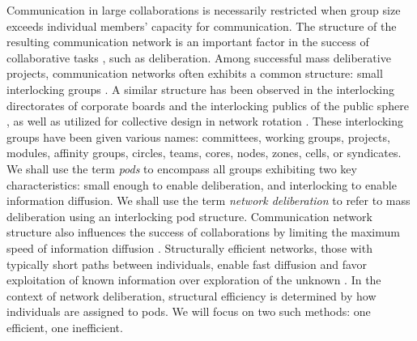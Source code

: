 Communication in large collaborations is necessarily restricted when group size exceeds individual members' capacity for communication. The structure of the resulting communication network is an important factor in the success of collaborative tasks \cite{kearns_experiments_2012, mason_collaborative_2012, mason_propagation_2008}, such as deliberation. Among successful mass deliberative projects, communication networks often exhibits a common structure: small interlocking groups \cite{benkler_coases_2002, gonzalez-bailon_networked_2016, brugh_combining_2019, laloux_reinventing_2014}. A similar structure has been observed in the interlocking directorates of corporate boards \cite{karau_social_1993} and the interlocking publics of the public sphere \cite{habermas_structural_1991}, as well as utilized for collective design in network rotation \cite{salehi_hive_2018}.
These interlocking groups have been given various names: committees, working groups, projects, modules, affinity groups, circles, teams, cores, nodes, zones, cells, or syndicates.
We shall use the term {\em pods} to encompass all groups exhibiting two key characteristics: small enough to enable deliberation, and interlocking to enable information diffusion.
We shall use the term {\em network deliberation} to refer to mass deliberation using an interlocking pod structure.
Communication network structure also influences the success of collaborations by limiting the maximum speed of information diffusion \cite{lazer_network_2007,mason_propagation_2008,mason_collaborative_2012,barkoczi_social_2016, gomez_clustering_2019,derex_partial_2016,kearns_experiments_2012}.
Structurally efficient networks,
those with typically short paths between individuals,
enable fast diffusion and favor exploitation of known information over exploration of the unknown \cite{lazer_network_2007, barkoczi_social_2016}. In the context of network deliberation, structural efficiency is determined by how individuals are assigned to pods.
We will focus on two such methods: one efficient, one inefficient.

